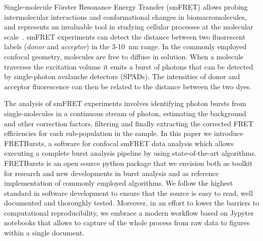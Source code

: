 Single-molecule Förster Resonance Energy Transfer (smFRET) allows probing intermolecular interactions
and conformational changes in biomacromolecules, and represents an 
invaluable tool in studying cellular processes at the molecular 
scale~\cite{Kapanidis_2006}. smFRET experiments can detect the distance between 
two fluorescent labels (\textit{donor} and \textit{acceptor}) in the 
3-10~nm range. In the commonly employed confocal geometry, molecules are free 
to diffuse in solution. When a molecule traverses the excitation volume it 
emits a burst of photons that can be detected by single-photon avalanche detectors (SPADs). 
The intensities of donor and acceptor fluorescence 
can then be related to the distance between the two dyes.

The analysis of smFRET experiments involves identifying photon bursts from 
single-molecules in a continuous stream of photon, estimating the 
background and other correction factors, filtering and finally extracting the corrected 
FRET efficiencies for each sub-population in the sample. In this paper we introduce FRETBursts,
a software for confocal smFRET data analysis which 
allows executing a complete burst analysis pipeline by using state-of-the-art algorithms.
FRETBursts is an open source python package that we envision both as toolkit 
for research and new developments in burst analysis and as reference implementation of commonly employed algorithms.
We follow the highest standard in software development to ensure that 
the source is easy to read, well documented and thoroughly tested. 
Moreover, in an effort to lower the barriers to computational reproducibility, 
we embrace a modern workflow based on Jypyter notebooks that allows to capture 
of the whole process from raw data to figures within a single document.
